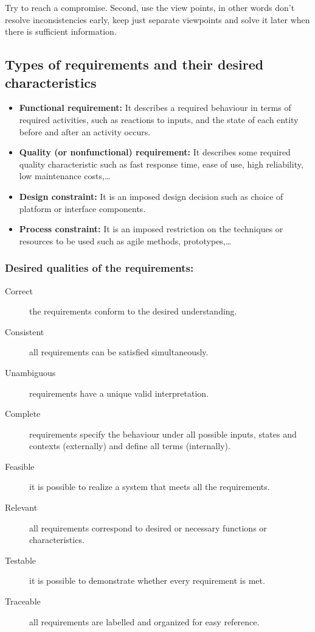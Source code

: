 Try to reach a compromise. Second, use the view points, in other words
don’t resolve inconsistencies early, keep just separate viewpoints and solve it later when
there is sufficient information.

\subsection{Types of requirements and their desired characteristics}

\begin{itemize}
    \item \textbf{Functional requirement:}
        It describes a required behaviour in terms of required activities, such as reactions to inputs,
        and the state of each entity before and after an activity occurs.

    \item \textbf{Quality (or nonfunctional) requirement:}
        It describes some required quality characteristic such as fast response time, ease of use,
        high reliability, low maintenance costs,\ldots

    \item \textbf{Design constraint:}
        It is an imposed design decision such as choice of platform or interface components.

    \item \textbf{Process constraint:}
        It is an imposed restriction on the techniques or resources to be used such as agile methods,
        prototypes,\ldots
\end{itemize}

\subsubsection{Desired qualities of the requirements:}

\begin{description}
    \item[Correct] the requirements conform to the desired understanding.
    \item[Consistent] all requirements can be satisfied simultaneously.
    \item[Unambiguous] requirements have a unique valid interpretation.
    \item[Complete] requirements specify the behaviour under all possible inputs, states and
contexts (externally) and define all terms (internally).
    \item[Feasible] it is possible to realize a system that meets all the requirements.
    \item[Relevant] all requirements correspond to desired or necessary functions or
characteristics.
    \item[Testable] it is possible to demonstrate whether every requirement is met.
    \item[Traceable] all requirements are labelled and organized for easy reference.
\end{description}

